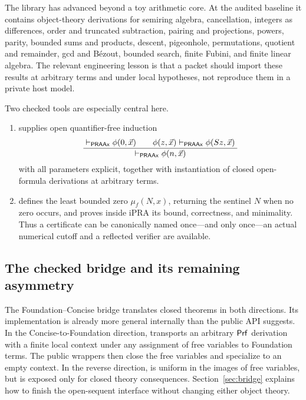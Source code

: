 The  library has advanced beyond a toy arithmetic core.
At the audited baseline it contains object-theory derivations for semiring
algebra, cancellation, integers as differences, order and truncated
subtraction, pairing and projections, powers, parity, bounded sums and
products, descent, pigeonhole, permutations, quotient and remainder, gcd and
B\'ezout, bounded search, finite Fubini, and finite linear algebra.  The
relevant engineering lesson is that a packet should import these results at
arbitrary terms and under local hypotheses, not reproduce them in a private
host model.

Two checked tools are especially central here.

\begin{enumerate}[label=(\roman*)]
\item {} supplies open quantifier-free induction
\[
  \frac{\;\mathrel{\vdash_{\mathsf{PRAAx}}} \phi(0,\vec x)\qquad
        \phi(z,\vec x)\mathrel{\vdash_{\mathsf{PRAAx}}}\phi(Sz,\vec x)\;}
       {\;\mathrel{\vdash_{\mathsf{PRAAx}}}\phi(n,\vec x)\;}
\]
with all parameters explicit, together with instantiation of closed open-formula
derivations at arbitrary terms.
\item {} defines the least bounded zero
\(\mu_f(N,x)\), returning the sentinel \(N\) when no zero occurs, and proves
inside iPRA its bound, correctness, and minimality.  Thus a certificate can be
canonically named once---and only once---an actual numerical cutoff and a
reflected verifier are available.
\end{enumerate}

\subsection{The checked bridge and its remaining asymmetry}

The Foundation--Concise bridge translates closed theorems in both directions.
Its implementation is already more general internally than the public API
suggests.  In the Concise-to-Foundation direction,
 transports an arbitrary
\(\mathsf{Prf}\) derivation with a finite local context under any assignment of free
variables to Foundation terms.  The public wrappers then close the free
variables and specialize to an empty context.  In the reverse direction,
 is uniform in the images of free variables, but
 is exposed only for closed theory consequences.
Section~\ref{sec:bridge} explains how to finish the open-sequent interface
without changing either object theory.

